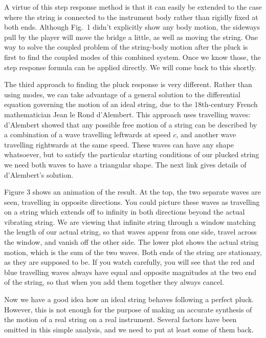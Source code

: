   A virtue of this step response method is that it can easily be extended to 
  the case where the string is connected to the instrument body rather than 
  rigidly fixed at both ends. Although Fig.\ 1 didn't explicitly show any body 
  motion, the sideways pull by the player will move the bridge a little, as 
  well as moving the string. One way to solve the coupled problem of the 
  string-body motion after the pluck is first to find the coupled modes of this 
  combined system. Once we know those, the step response formula can be applied 
  directly. We will come back to this shortly. 

  The third approach to finding the pluck response is very different. Rather 
  than using modes, we can take advantage of a general solution to the 
  differential equation governing the motion of an ideal string, due to the 
  18th-century French mathematician Jean le Rond d'Alembert. This approach uses 
  travelling waves: d'Alembert showed that any possible free motion of a string 
  can be described by a combination of a wave travelling leftwards at speed 
  $c$, and another wave travelling rightwards at the same speed. These waves 
  can have any shape whatsoever, but to satisfy the particular starting 
  conditions of our plucked string we need both waves to have a triangular 
  shape. The next link gives details of d'Alembert's solution. 

  Figure 3 shows an animation of the result. At the top, the two separate waves 
  are seen, travelling in opposite directions. You could picture these waves as 
  travelling on a string which extends off to infinity in both directions 
  beyond the actual vibrating string. We are viewing that infinite string 
  through a window matching the length of our actual string, so that waves 
  appear from one side, travel across the window, and vanish off the other 
  side. The lower plot shows the actual string motion, which is the sum of the 
  two waves. Both ends of the string are stationary, as they are supposed to 
  be. If you watch carefully, you will see that the red and blue travelling 
  waves always have equal and opposite magnitudes at the two end of the string, 
  so that when you add them together they always cancel. 

  Now we have a good idea how an ideal string behaves following a perfect 
  pluck. However, this is not enough for the purpose of making an accurate 
  synthesis of the motion of a real string on a real instrument. Several 
  factors have been omitted in this simple analysis, and we need to put at 
  least some of them back. 


